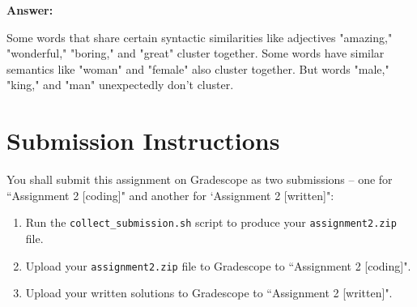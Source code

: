 \documentclass{article}
\newenvironment{answer}{
        {\bf Answer:} \sf \begingroup\color{red}
    }{\endgroup}%
\begin{document}
\begin{enumerate}
        \begin{shaded}
            \begin{answer}
                Some words that share certain syntactic similarities like adjectives "amazing," "wonderful," "boring," and "great" cluster together.
                Some words have similar semantics like "woman" and "female" also cluster together.
                But words "male," "king," and "man" unexpectedly don't cluster.
            \end{answer}
        \end{shaded}


        \section{Submission Instructions}
        You shall submit this assignment on Gradescope as two submissions -- one for ``Assignment 2 [coding]" and another for `Assignment 2 [written]":
        \begin{enumerate}
            \item Run the \texttt{collect\_submission.sh} script to produce your \texttt{assignment2.zip} file.
            \item Upload your \texttt{assignment2.zip} file to Gradescope to ``Assignment 2 [coding]".
            \item Upload your written solutions to Gradescope to ``Assignment 2 [written]".
        \end{enumerate}

    \end{enumerate}
\end{document}
